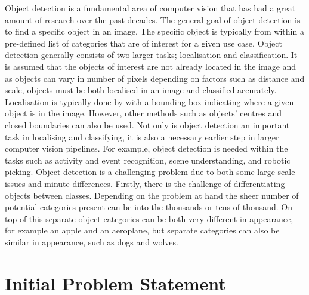 \begin{comment}
	- fundamental problem in CV
		- much work over previous decades
	- goal: find specific category in a given image
		- of interest by itself. Localise and classification
		- also a pre-requisite step to higher-level vision tasks
			- activity & event recognition, scene understanding, + find more
	- difficulties 
		- inter-class differences small
		- intra-class variations large
			- shape, pose, colour, texture, background, differences in illumination/viewpoint etc between images
	- GPU/deep learning advances have meant that performance is starting to become satisfactory for real-world use in scenarios requiring high precision and accuracy
		- autonomous vehicles, military, medicinal
	- much discussion of AI taking labor jobs
		- find articles and specific examples
			- elon musk, bill gates, etc (leaders of tech)
		- object detection needed
		- improvements still to be made before being completely realised
	- next section, overview of object detection definition, key task and challenges within. Also SOTA related work
\end{comment}


Object detection is a fundamental area of computer vision that has had a great amount of research over the past decades. The general goal of object detection is to find a specific object in an image. The specific object is typically from within a pre-defined list of categories that are of interest for a given use case. Object detection generally consists of two larger tasks; localisation and classification. It is assumed that the objects of interest are not already located in the image and as objects can vary in number of pixels depending on factors such as distance and scale, objects must be both localised in an image and classified accurately. Localisation is typically done by with a bounding-box indicating where a given object is in the image. However, other methods such as objects' centres and closed boundaries can also be used. Not only is object detection an important task in localising and classifying, it is also a necessary earlier step in larger computer vision pipelines. For example, object detection is needed within the tasks such as activity and event recognition, scene understanding, and robotic picking.
Object detection is a challenging problem due to both some large scale issues and minute differences. Firstly, there is the challenge of differentiating objects between classes. Depending on the problem at hand the sheer number of potential categories present can be into the thousands or tens of thousand. On top of this separate object categories can be both very different in appearance, for example an apple and an aeroplane, but separate categories can also be similar in appearance, such as dogs and wolves.

\section{Initial Problem Statement}

\begin{comment}
	- what are specific problems within object detection?
	- 
\end{comment}

